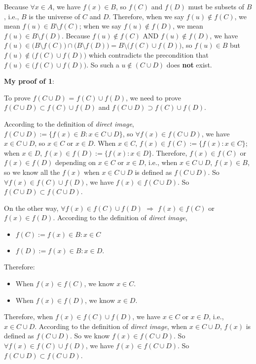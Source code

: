 \documentclass[12pt, letterpaper, oneside]{book}
\begin{document}
Because $\forall x \in A$, we have $f(x) \in B$, so $f(C)$ and $f(D)$ must be
subsets of $B$, i.e., $B$ is the universe of $C$ and $D$. Therefore, when we
say $f(u) \notin f(C)$, we mean $f(u) \in B \setminus f(C)$; when we say $f(u)
\notin f(D)$, we mean $f(u) \in B \setminus f(D)$. Because $f(u) \notin f(C)$
AND $f(u) \notin f(D)$, we have $f(u) \in \bigl(B \setminus f(C)\bigr) \cap
\bigl(B \setminus f(D)\bigr) = B \setminus \bigl(f(C) \cup f(D)\bigr)$, so
$f(u) \in B$ but $f(u) \notin \bigl(f(C) \cup f(D)\bigr)$ which contradicts
the precondition that $f(u) \in \bigl(f(C) \cup f(D)\bigr)$. So such a $u
\notin (C \cup D)$ does \textbf{not} exist.

\textbf{My proof of 1}:

To prove $f(C \cup D)$ = $f(C) \cup f(D)$, we need to prove $f(C \cup D)
\subset f(C) \cup f(D)$ and $f(C \cup D) \supset f(C) \cup f(D)$.

According to the definition of \textit{direct image}, $f(C \cup D) := \{f(x)
\in B: x \in C \cup D\}$, so $\forall f(x) \in f(C \cup D)$, we have $x \in C
\cup D$, so $x \in C$ or $x \in D$. When $x \in C$, $f(x) \in f(C) := \{f(x): x
\in C\}$; when $x \in D$, $f(x) \in f(D) := \{f(x): x \in D\}$. Therefore, $f(x)
\in f(C)$ or $f(x) \in f(D)$ depending on $x \in C$ or $x \in D$, i.e., when $x
\in C \cup D$, $f(x) \in B$, so we know all the $f(x)$ when $x \in C \cup D$ is
defined as $f(C \cup D)$. So $\forall f(x) \in f(C) \cup f(D)$, we have $f(x)
\in f(C \cup D)$. So $f(C \cup D) \subset f(C \cup D)$.

On the other way, $\forall f(x) \in f(C) \cup f(D)$ $\Rightarrow$ $f(x) \in
f(C)$ or $f(x) \in f(D)$. According to the definition of \textit{direct image},
\begin{itemize}
  \item $f(C) := {f(x) \in B: x \in C}$
  \item $f(D) := {f(x) \in B: x \in D}$.
\end{itemize}

Therefore:
\begin{itemize}
  \item When $f(x) \in f(C)$, we know $x \in C$.
  \item When $f(x) \in f(D)$, we know $x \in D$.
\end{itemize}

Therefore, when $f(x) \in f(C) \cup f(D)$, we have $x \in C$ or $x \in D$, i.e.,
$x \in C \cup D$. According to the definition of \textit{direct image}, when $x
\in C \cup D$, $f(x)$ is defined as $f(C \cup D)$. So we know $f(x) \in f(C
\cup D)$. So $\forall f(x) \in f(C) \cup f(D)$, we have $f(x) \in f(C \cup D)$.
So $f(C \cup D) \subset f(C \cup D)$.
\end{document}
